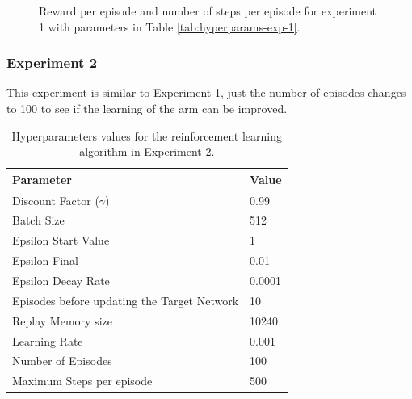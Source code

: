 \documentclass[12pt,oneside]{article}
\begin{document}
\begin{figure}[H]
  \centering
  \hspace{0\textwidth}  
  \caption{Reward per episode and number of steps per episode for experiment 1 with parameters in Table \ref{tab:hyperparams-exp-1}.}
  \label{fig:experiment-1}
\end{figure}
\subsubsection{Experiment 2}\label{experiment:experiment-2}
This experiment is similar to Experiment 1, just the number of episodes changes to 100 to see if the learning of the arm can be improved.
\begin{table}[H]
\centering
\begin{tabular}{l l}
\hline
Parameter & Value \\
\hline
Discount Factor ($\gamma$) & 0.99 \\
Batch Size & 512 \\
Epsilon Start Value & 1 \\
Epsilon Final & 0.01 \\
Epsilon Decay Rate & 0.0001 \\
Episodes before updating the Target Network & 10 \\
Replay Memory size & 10240 \\
Learning Rate & 0.001 \\
Number of Episodes & 100 \\
Maximum Steps per episode & 500 \\
\hline
\end{tabular}
\caption{Hyperparameters values for the reinforcement learning algorithm in Experiment 2.}
\label{tab:hyperparams-exp-2}
\end{table}
\end{document}
